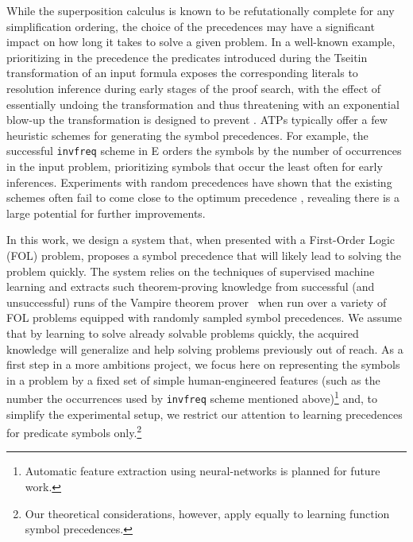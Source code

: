 While the superposition calculus is known \cite{DBLP:journals/logcom/BachmairG94} to be refutationally complete for any simplification ordering, the choice of the precedences may have a significant impact on how long it takes to solve a given problem.
In a well-known example, prioritizing in the precedence the predicates introduced during the Tseitin transformation of an input formula \cite{Tseitin1983} exposes the corresponding literals to resolution inference during early stages of the proof search,
with the effect of essentially undoing the transformation and thus threatening with an exponential blow-up
the transformation is designed to prevent \cite{Reger2016}.
%
ATPs typically offer a few heuristic schemes for generating the symbol precedences.
For example, the successful \texttt{invfreq} scheme in E \cite{E-manual} orders the symbols by the number of occurrences in the input problem,
prioritizing symbols that occur the least often for early inferences.
Experiments with random precedences have shown that the existing schemes often fail to come close to the optimum precedence \cite{RegerSuda2017}, revealing there is a large potential for further improvements.

In this work, we design a system that, when presented with a First-Order Logic (FOL) problem,
proposes a symbol precedence that will likely lead to solving the problem quickly.
The system relies on the techniques of supervised machine learning and extracts
such theorem-proving knowledge from successful (and unsuccessful) runs of 
the Vampire theorem prover~\cite{Kovacs2013} when run over a variety of FOL problems equipped
with randomly sampled symbol precedences. 
We assume that by learning to solve already solvable problems quickly,
the acquired knowledge will generalize and help solving problems previously out of reach.
As a first step in a more ambitions project,
we focus here on representing the symbols in a problem by a fixed set of simple human-engineered features
(such as the number the occurrences used by \texttt{invfreq} scheme mentioned above)\footnote{Automatic
feature extraction using neural-networks is planned for future work.}
and, to simplify the experimental setup, we restrict our attention to learning precedences for predicate symbols only.\footnote{
Our theoretical considerations, however, apply equally to learning function symbol precedences.}

